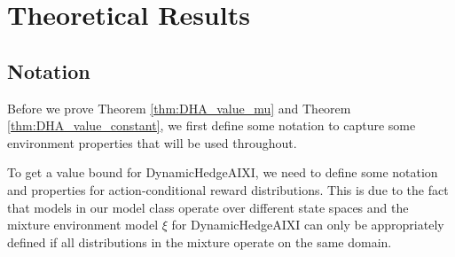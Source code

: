 \iffalse
    

    
    
    \newpage
    \section{Theoretical Results}
    \label{appendix:theory}
    
    \iffalse
    \subsection{Notation}
    Before we prove Theorem \ref{thm:DHA_value_mu} and Theorem \ref{thm:DHA_value_constant}, we first define some notation to capture some environment properties that will be used throughout.
    
    To get a value bound for DynamicHedgeAIXI, we need to define some notation and properties for action-conditional reward distributions. This is due to the fact that models in our model class operate over different state spaces and the mixture environment model $\xi$ for DynamicHedgeAIXI can only be appropriately defined if all distributions in the mixture operate on the same domain.
    
